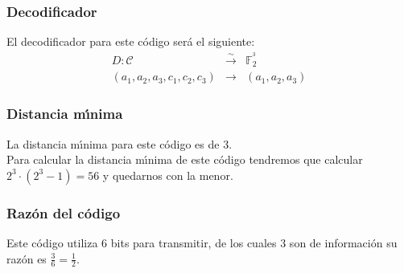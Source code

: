 \subsubsection{Decodificador}

El decodificador para este c\'odigo ser\'a el siguiente:
\begin{eqnarray*}
D:\mathcal{C}&\stackrel{\sim}\longrightarrow & \mathbb{F}^{^3}_2 \\
(a_1,a_2,a_3,c_1,c_2,c_3) &\longrightarrow & (a_1,a_2,a_3)
\end{eqnarray*}

\subsubsection{Distancia m\'{\i}nima}

La distancia m\'{\i}nima para este c\'odigo es de $3$.\\

Para calcular la distancia m\'{\i}nima de este c\'odigo tendremos que calcular
$2^3\cdot (2^3-1) = 56$ y quedarnos con la menor.

\subsubsection{Raz\'on del c\'odigo}

Este c\'odigo utiliza $6$ bits para transmitir, de los cuales $3$ son de 
informaci\'on su raz\'on es $\frac{3}{6}=\frac{1}{2}$.
